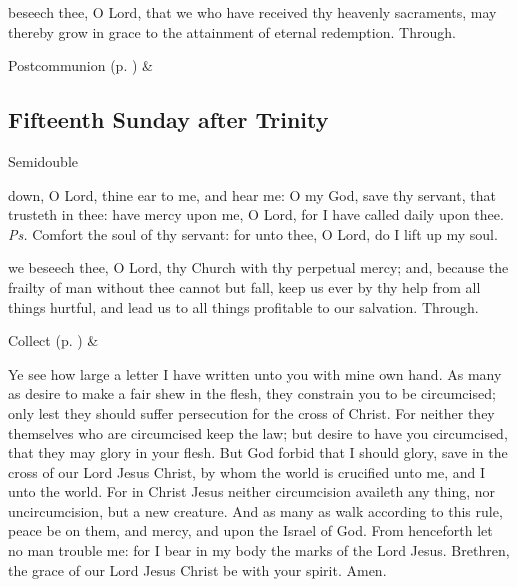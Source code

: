 
\postcommunion
{} beseech thee, O Lord, that we who have received thy heavenly sacraments, may thereby grow in grace to the attainment of eternal redemption. Through.
\begin{rubric}
     Postcommunion  (p. \pageref{SPSaints}) \&  
\end{rubric}


\clearpage
\subsection{Fifteenth Sunday after Trinity}
\begin{inhead}
{Semidouble}
\end{inhead}


\introit
{} down, O Lord, thine ear to me, and hear me: O my God, save thy servant, that trusteth in thee: have mercy upon me, O Lord, for I have called daily upon thee. \textit{Ps.} Comfort the soul of thy servant: for unto thee, O Lord, do I lift up my soul.

\collect
{} we beseech thee, O Lord, thy Church with thy perpetual mercy; and, because the frailty of man without thee cannot but fall, keep us ever by thy help from all things hurtful, and lead us to all things profitable to our salvation. Through.
\begin{rubric}
     Collect  (p. \pageref{SPSaints}) \&  
\end{rubric}

 Ye see how large a letter I have written unto you with mine own hand. As many as desire to make a fair shew in the flesh, they constrain you to be circumcised; only lest they should suffer persecution for the cross of Christ. For neither they themselves who are circumcised keep the law; but desire to have you circumcised, that they may glory in your flesh. But God forbid that I should glory, save in the cross of our Lord Jesus Christ, by whom the world is crucified unto me, and I unto the world. For in Christ Jesus neither circumcision availeth any thing, nor uncircumcision, but a new creature. And as many as walk according to this rule, peace be on them, and mercy, and upon the Israel of God. From henceforth let no man trouble me: for I bear in my body the marks of the Lord Jesus. Brethren, the grace of our Lord Jesus Christ be with your spirit. Amen.

